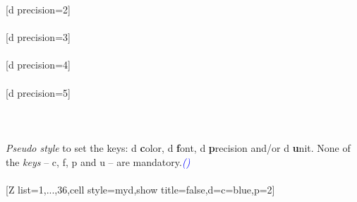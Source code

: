 [d precision=2]%
\\ [10pt]\makebox[\linewidth][c]{\scalebox{.6}{\pgfPT[d precision=2]}}%
\\ [10pt][d precision=3]%
\\ [10pt]\makebox[\linewidth][c]{\scalebox{.6}{\pgfPT[d precision=3]}}%
\\ [10pt][d precision=4]%
\\ [10pt]\makebox[\linewidth][c]{\scalebox{.6}{\pgfPT[d precision=4]}}%
\\ [10pt][d precision=5]%
\\ [10pt]\makebox[\linewidth][c]{\scalebox{.6}{\pgfPT[d precision=5]}}%
\\ [0pt]\pgfPTendoption%
\newpage\ \\ [-32pt]%
%
{\ \\ [-3pt]\textit{Pseudo style} to set the keys: d \textbf{c}olor, d \textbf{f}ont, d \textbf{p}recision and/or d \textbf{u}nit.
None of the \textit{keys} -- c, f, p and u -- are mandatory.\hfill\textit{\textcolor{blue}{()}}
\\ [10pt]%
}%
\\ [5pt][Z list={1,...,36},cell style=myd,show title=false,d={c=blue,p=2}]%
\\ [10pt]\makebox[\linewidth][c]{\scalebox{.6}{\pgfPT[Z list={1,...,36},cell style=myd,show title=false,d={c=blue,p=2}]}}%
\\ [0pt]\pgfPTendstyle%
\endinput
